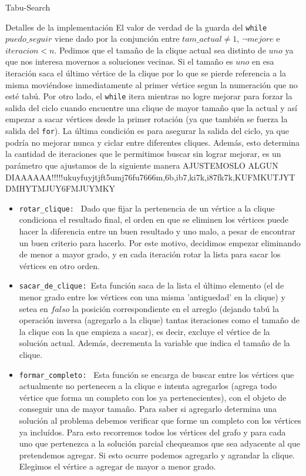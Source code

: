 \begin{section}{Tabu-Search}
\begin{subsection}{Detalles de la implementación}
		El valor de verdad de la guarda del \texttt{while} $puedo\_seguir$ viene dado por la conjunción entre $tam\_actual \neq 1$, $\neg mejore$ e $iteracion<n$.
		Pedimos que el tamaño de la clique actual sea distinto de $uno$ ya que nos interesa movernos a soluciones vecinas. Si el tamaño es $uno$ en esa iteración saca el último vértice de la clique por lo que se pierde referencia a la misma moviéndose inmediatamente al primer vértice segun la numeración que no esté tabú.
		Por otro lado, el \texttt{while} itera mientras no logre mejorar para forzar la salida del ciclo cuando encuentre una clique de mayor tamaño que la actual y así empezar a sacar vértices desde la primer rotación (ya que también se fuerza la salida del \texttt{for}).
		La última condición es para asegurar la salida del ciclo, ya que podría no mejorar nunca y ciclar entre diferentes cliques. Además, esto determina la cantidad de iteraciones que le permitimos buscar sin lograr mejorar, es un parámetro que ajustamos de la siguiente manera AJUSTEMOSLO ALGUN DIAAAAAA!!!!!ukuyfuyjtjft5umj76fu7666m,6b,ib7,ki7k,i87fk7k,KUFMKUTJYTDMHYTMJUY6FMJUYMKY

		\begin{itemize}			
			\item \texttt{rotar\_clique: } Dado que fijar la pertenencia de un vértice a la clique condiciona el resultado final, el orden en que se eliminen los vértices puede hacer la diferencia entre un buen resultado y uno malo, a pesar de encontrar un buen criterio para hacerlo. Por este motivo, decidimos empezar eliminando de menor a mayor grado, y en cada iteración rotar la lista para sacar los vértices en otro orden.
			
			\item \texttt{sacar\_de\_clique: }Esta función saca de la lista el último elemento (el de menor grado entre los vértices con una misma 'antiguedad' en la clique) y setea en $falso$ la posición correspondiente en el arreglo (dejando tabú la operación inversa (agregarlo a la clique) tantas iteraciones como el tamaño de la clique con la que empieza a sacar), es decir, excluye el vértice de la solución actual. Además, decrementa la variable que indica el tamaño de la clique.
			
			\item \texttt{formar\_completo: } Esta función se encarga de buscar entre los vértices que actualmente no pertenecen a la clique e intenta agregarlos (agrega todo vértice que forma un completo con los ya pertenecientes), con el objeto de conseguir una de mayor tamaño. Para saber si agregarlo determina una solución al problema debemos verificar que forme un completo con los vértices ya incluídos. Para esto recorremos todos los vértices del grafo y para cada uno que pertenezca a la solución parcial chequeamos que sea adyacente al que pretendemos agregar. Si esto ocurre podemos agregarlo y agrandar la clique. Elegimos el vértice a agregar de mayor a menor grado.
			

\end{itemize}
\end{subsection}
\end{section}
